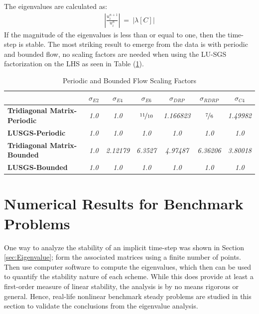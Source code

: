 \documentclass[conf]{new-aiaa}
\begin{document}
The eigenvalues are calculated as:
\begin{equation}
	\begin{split}
		\label{eq:Magnitude_Of_Eigen}
  			\left|\frac{u_i^{n+1}}{u_i^{n}}\right|~=~\left|\lambda\left[C\right]\right|
	\end{split}
\end{equation}
If the magnitude of the eigenvalues is less than or equal to one, then the time-step is stable.   
The most striking result to emerge from the data is with periodic and bounded flow, no scaling factors are needed when using the LU-SGS factorization on the LHS as seen in Table (\ref{tab:Scaling}). 

\begin{table}[htp!]
\centering
\caption{Periodic and Bounded Flow Scaling Factors}
\begin{tabular}{|l|c|c|c|c|c|c|}
\hline
 & \multicolumn{1}{c|}{\textbf{$\sigma_{E2}$}} & \multicolumn{1}{c|}{\textbf{$\sigma_{E4}$}} & \multicolumn{1}{c|}{$\sigma_{E6}$} & \multicolumn{1}{c|}{$\sigma_{DRP}$} & \multicolumn{1}{c|}{$\sigma_{RDRP}$}& \multicolumn{1}{c|}{$\sigma_{C4}$}\\ \hline
\textbf{Tridiagonal Matrix-Periodic} & \textit{1.0} & \textit{1.0} & \textit{$\nicefrac{11}{10}$} & \textit{1.166823} & \textit{$\nicefrac{7}{6}$} & \textit{1.49982}\\ \hline
\textbf{LUSGS-Periodic} & \textit{1.0} & \textit{1.0} & \textit{1.0} & \textit{1.0} & \textit{1.0} & \textit{1.0}\\ \hline
\textbf{Tridiagonal Matrix-Bounded} & \textit{1.0} & \textit{2.12179} & \textit{6.3527} & 
	\textit{4.97487} & 
	\textit{6.36206}& 
	\textit{3.80018}\\ \hline
\textbf{LUSGS-Bounded} & \textit{1.0} & \textit{1.0} & \textit{1.0} & 
	\textit{1.0} & 
	\textit{1.0} & 
	\textit{1.0}\\ \hline
\end{tabular}
\label{tab:Scaling}
\end{table}


\section{Numerical Results for Benchmark
Problems}
One way to analyze the stability of an implicit time-step was shown in Section \ref{sec:Eigenvalue}; 
form the associated matrices using a finite number of points. Then use computer software to compute the eigenvalues, which then can be used to quantify the stability nature of each scheme. 
While this does provide at least a first-order measure of linear stability, the analysis is by no means rigorous or general. 
Hence, real-life nonlinear benchmark steady problems are studied in this section to validate the conclusions from the eigenvalue analysis. 
\end{document}
